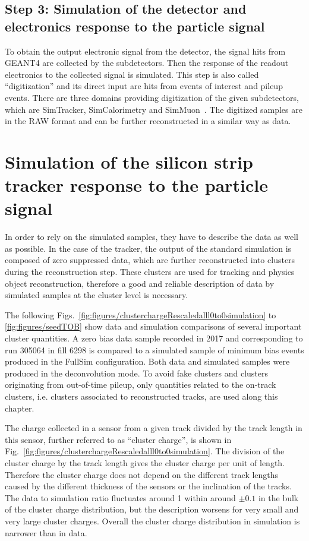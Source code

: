\subsection{Step 3: Simulation of the detector and electronics response to the particle signal}

To obtain the output electronic signal from the detector, the signal hits from GEANT4 are collected by the subdetectors. Then the response of the readout electronics to the collected signal is simulated. This step is also called ``digitization'' and its direct input are hits from events of interest and pileup events. There are three domains providing digitization of the given subdetectors, which are SimTracker, SimCalorimetry and SimMuon~\cite{website:simdigi}. The digitized samples are in the RAW format and can be further reconstructed in a similar way as data.


\section{Simulation of the silicon strip tracker response to the particle signal~\label{sec:trackerSimu}}

In order to rely on the simulated samples, they have to describe the data as well as possible. In the case of the tracker, the output of the standard simulation is composed of zero suppressed data, which are further reconstructed into clusters during the reconstruction step. These clusters are used for tracking and physics object reconstruction, therefore a good and reliable description of data by simulated samples at the cluster level is necessary.

The following Figs.~\ref{fig:figures/clusterchargeRescaledalll0to0simulation} to \ref{fig:figures/seedTOB} show data and simulation comparisons of several important cluster quantities. A zero bias data sample recorded in 2017 and corresponding to run 305064 in fill 6298 is compared to a simulated sample of minimum bias events produced in the FullSim configuration. Both data and simulated samples were produced in the deconvolution mode. To avoid fake clusters and clusters originating from out-of-time pileup, only quantities related to the on-track clusters, i.e. clusters associated to reconstructed tracks, are used along this chapter.
 
The charge collected in a sensor from a given track divided by the track length in this sensor, further referred to as ``cluster charge'', is shown in Fig.~\ref{fig:figures/clusterchargeRescaledalll0to0simulation}. The division of the cluster charge by the track length gives the cluster charge per unit of length. Therefore the cluster charge does not depend on the different track lengths caused by the different thickness of the sensors or the inclination of the tracks.  The data to simulation ratio fluctuates around 1 within around $\pm 0.1$ in the bulk of the cluster charge distribution, but the description worsens for very small and very large cluster charges. Overall the cluster charge distribution in simulation is narrower than in data. 


